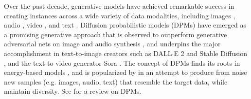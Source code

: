\documentclass[letterpaper,11pt,reqno]{amsart}
\numberwithin{equation}{section}
\begin{document}
\quad Over the past decade, generative models have achieved remarkable success
in creating instances across a wide variety of data modalities,
including images \cite{Good14, Brock18, Razavi19},
audio \cite{Prenger19, Borsos23}, video \cite{Kal17},
and text \cite{Vaswani17, Brown20, Yang19}.
Diffusion probabilistic models (DPMs) have emerged as a promising generative approach
that is observed to outperform generative adversarial nets on image and audio synthesis \cite{Dh21, Kong21},
and underpins the major accomplishment in text-to-image creators such as 
DALL$\cdot$E 2 \cite{Ramesh22} and Stable Diffusion \cite{Rombach22},
and the text-to-video generator Sora \cite{Sora}.
The concept of DPMs finds its roots in energy-based models \cite{Sohl15},
and is popularized by  \cite{Song19, Song20, Ho20}
in an attempt to produce from noise new samples 
(e.g. images, audio, text)
that resemble the target data, while maintain diversity.
See \cite{Yang23,Tutorial,chen2024overview} for a review on DPMs.
\end{document}
